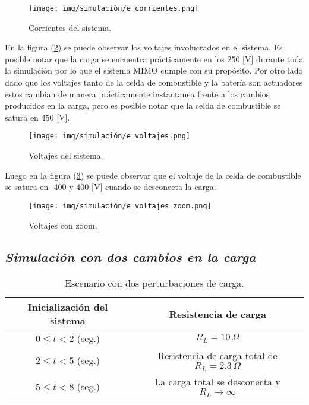 \begin{figure}[H]
    \centering
    \texttt{[image: img/simulación/e\_corrientes.png]}
    \caption{Corrientes del sistema.}
    \label{fig:e_corrientes}
\end{figure}

En la figura (\ref{fig:e_voltajes}) se puede observar los voltajes involucrados
en el sistema. Es posible notar que la carga se encuentra prácticamente en 
los 250 [V] durante toda la simulación por lo que el sistema MIMO cumple con 
su propósito. Por otro lado dado que los voltajes tanto de la celda de 
combustible y la batería son actuadores estos cambian de manera prácticamente
instantanea frente a los cambios producidos en la carga, pero es posible notar
que la celda de combustible se satura en 450 [V].

\begin{figure}[H]
    \centering
    \texttt{[image: img/simulación/e\_voltajes.png]}
    \caption{Voltajes del sistema.}
    \label{fig:e_voltajes}
\end{figure}

Luego en la figura (\ref{fig:e_voltajes_zoom}) se puede observar que el 
voltaje de la celda de combustible se satura en -400 y 400 [V] cuando se
desconecta la carga.

\begin{figure}[H]
    \centering
    \texttt{[image: img/simulación/e\_voltajes\_zoom.png]}
    \caption{Voltajes con zoom.}
    \label{fig:e_voltajes_zoom}
\end{figure}



\subsection{\textit{Simulación con dos cambios en la carga}}

\begin{table}[H]
    \centering
    \begin{tabular}{|c|c|}
    \hline
    \textbf{Inicialización del sistema} & \textbf{Resistencia de carga} \\
    \hline
    $0 \leq t < 2$ (seg.) & $R_L = 10\,\Omega$ \\
    \hline
    $2 \leq t < 5$ (seg.) & Resistencia de carga total de $R_L = 2.3\,\Omega$ \\
    \hline
    $5 \leq t < 8$ (seg.) & La carga total se desconecta y $R_L \rightarrow \infty$ \\
    \hline
\end{tabular}
\caption{Escenario con dos perturbaciones de carga.}
\label{tab:f}
\end{table}


